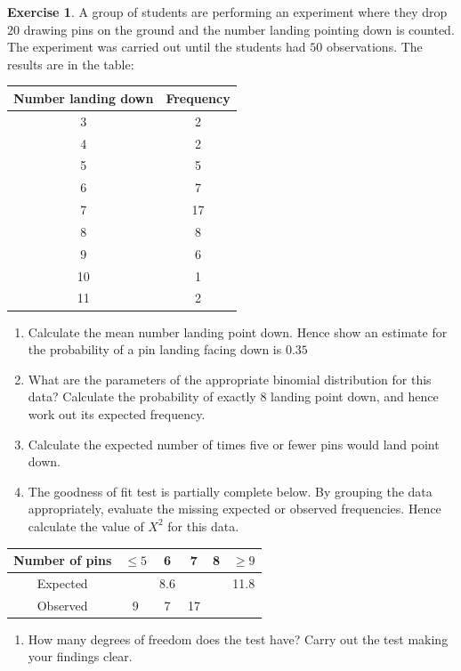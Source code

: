 \documentclass[
]{book}
\providecommand{\tightlist}{%
  \setlength{\itemsep}{0pt}\setlength{\parskip}{0pt}}
\theoremstyle{definition}
\theoremstyle{definition}
\theoremstyle{definition}
\newtheorem{exercise}{Exercise}[chapter]
\theoremstyle{definition}
\theoremstyle{remark}
\begin{document}
\begin{exercise}

A group of students are performing an experiment where they drop \(20\) drawing pins on the ground and the number landing pointing down is counted. The experiment was carried out until the students had \(50\) observations. The results are in the table:

\begin{longtable}[]{@{}cc@{}}
\toprule
Number landing down & Frequency\tabularnewline
\midrule
\endhead
3 & 2\tabularnewline
4 & 2\tabularnewline
5 & 5\tabularnewline
6 & 7\tabularnewline
7 & 17\tabularnewline
8 & 8\tabularnewline
9 & 6\tabularnewline
10 & 1\tabularnewline
11 & 2\tabularnewline
\bottomrule
\end{longtable}

\begin{enumerate}
\def\labelenumi{\alph{enumi})}
\item
  Calculate the mean number landing point down. Hence show an estimate for the probability of a pin landing facing down is \(0.35\)
\item
  What are the parameters of the appropriate binomial distribution for this data? Calculate the probability of exactly \(8\) landing point down, and hence work out its expected frequency.
\item
  Calculate the expected number of times five or fewer pins would land point down.
\item
  The goodness of fit test is partially complete below. By grouping the data appropriately, evaluate the missing expected or observed frequencies. Hence calculate the value of \(X^2\) for this data.
\end{enumerate}

\begin{longtable}[]{@{}cccccc@{}}
\toprule
Number of pins & \(\leq 5\) & 6 & 7 & 8 & \(\geq 9\)\tabularnewline
\midrule
\endhead
Expected & & 8.6 & & & 11.8\tabularnewline
Observed & 9 & 7 & 17 & &\tabularnewline
\bottomrule
\end{longtable}

\begin{enumerate}
\def\labelenumi{\alph{enumi})}
\setcounter{enumi}{4}
\tightlist
\item
  How many degrees of freedom does the test have? Carry out the test making your findings clear.
\end{enumerate}

\end{exercise}
\end{document}
